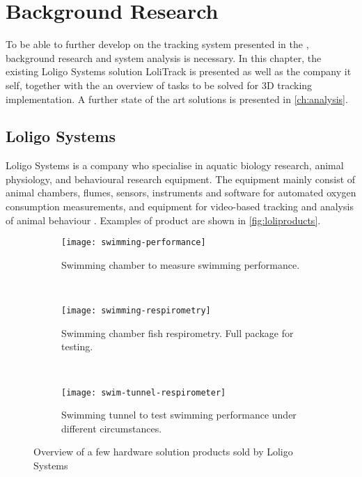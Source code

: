 \graphicspath{{figures/research/}}
\chapter{Background Research}\glsresetall
\label{ch:research}
To be able to further develop on the tracking system presented in the , background research and system analysis is necessary. In this chapter, the existing Loligo Systems solution LoliTrack is presented as well as the company it self, together with the an overview of tasks to be solved for 3D tracking implementation. A further state of the art solutions is presented in \autoref{ch:analysis}.

\section{Loligo Systems}\label{sec:loligo_res}
Loligo Systems is a company who specialise in aquatic biology research, animal physiology, and  behavioural research equipment. The equipment mainly consist of animal chambers, flumes, sensors, instruments and software for automated oxygen consumption measurements, and equipment for video-based tracking and analysis of animal behaviour \citep{LoligoS}. Examples of product are shown in \autoref{fig:loliproducts}.

\begin{figure}[H]
	\centering
	\begin{subfigure}{0.33\textwidth}
		\texttt{[image: swimming-performance]}
		\caption{Swimming chamber to measure swimming performance.}
	\end{subfigure}
~
	\begin{subfigure}{0.33\textwidth}
		\texttt{[image: swimming-respirometry]}
		\caption{Swimming chamber fish respirometry. Full package for testing.}
	\end{subfigure}
~
	\begin{subfigure}{0.32\textwidth}
		\texttt{[image: swim-tunnel-respirometer]}
		\caption{Swimming tunnel to test swimming performance under different circumstances.}
	\end{subfigure}
\caption{Overview of a few hardware solution products sold by Loligo Systems \citep{LoligoS}}
\label{fig:loliproducts}
\end{figure}

